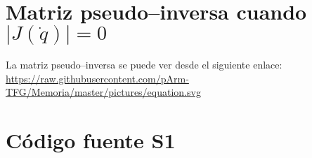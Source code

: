 % 

\newpage
\chapter{Matriz pseudo--inversa cuando $\left|J\left(\dot{q}\right)\right| = 0$}
\label{anex:pinv}
La matriz pseudo--inversa se puede ver desde el siguiente enlace:
\url{https://raw.githubusercontent.com/pArm-TFG/Memoria/master/pictures/equation.svg}\qquad
{}

\chapter{Código fuente \ac{S1}}















